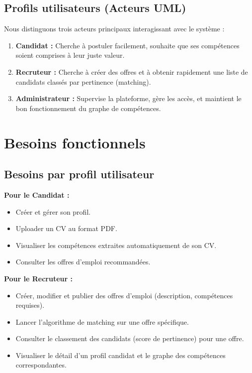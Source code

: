 \documentclass[12pt,a4paper]{report}
\begin{document}
\subsection{Profils utilisateurs (Acteurs UML)}
Nous distinguons trois acteurs principaux interagissant avec le système :
\begin{enumerate}
    \item \textbf{Candidat :} Cherche à postuler facilement, souhaite que ses compétences soient comprises à leur juste valeur.
    \item \textbf{Recruteur :} Cherche à créer des offres et à obtenir rapidement une liste de candidats classés par pertinence (matching).
    \item \textbf{Administrateur :} Supervise la plateforme, gère les accès, et maintient le bon fonctionnement du graphe de compétences.
\end{enumerate}

\section{Besoins fonctionnels}

\subsection{Besoins par profil utilisateur}
\textbf{Pour le Candidat :}
\begin{itemize}
    \item Créer et gérer son profil.
    \item Uploader un CV au format PDF.
    \item Visualiser les compétences extraites automatiquement de son CV.
    \item Consulter les offres d'emploi recommandées.
\end{itemize}

\textbf{Pour le Recruteur :}
\begin{itemize}
    \item Créer, modifier et publier des offres d'emploi (description, compétences requises).
    \item Lancer l'algorithme de matching sur une offre spécifique.
    \item Consulter le classement des candidats (score de pertinence) pour une offre.
    \item Visualiser le détail d'un profil candidat et le graphe des compétences correspondantes.
\end{itemize}
\end{document}
